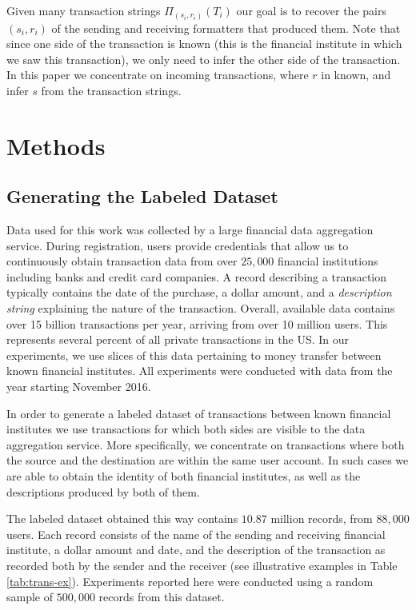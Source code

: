 \documentclass[sigconf]{acmart}
\begin{document}
Given many transaction strings $\Pi_{(s_i,r_i)} (T_i)$ our goal is to recover the pairs $(s_i,r_i)$ of the sending and receiving formatters that produced them. Note that since one side of the transaction is known (this is the financial institute in which we saw this transaction), we only need to infer the other side of the transaction. In this paper we concentrate on incoming transactions, where $r$ in known, and infer $s$ from the transaction strings. 

\section{Methods}
\label{sec:methods}

\subsection{Generating the Labeled Dataset}
\label{subs:dataset}

Data used for this work was collected by a large financial data aggregation service. During registration, users provide credentials that allow us to continuously obtain transaction data from over $25,000$ financial institutions including banks and credit card companies. A record describing a transaction typically contains the date of the purchase, a dollar amount, and a \textit{description string} explaining the nature of the transaction. Overall, available data contains over 15 billion transactions per year, arriving from over 10 million users. This represents several percent of all private transactions in the US. In our experiments, we use slices of this data pertaining to money transfer between known financial institutes. All experiments were conducted with data from the year starting November 2016.

In order to generate a labeled dataset of transactions between known financial institutes we use transactions for which both sides are visible to the data aggregation service. More specifically, we concentrate on transactions where both the source and the destination are within the same user account. In such cases we are able to obtain the identity of both financial institutes, as well as the descriptions produced by both of them. 

The labeled dataset obtained this way contains $10.87$ million records, from $88,000$ users. Each record consists of the name of the sending and receiving financial institute, a dollar amount and date, and the description of the transaction as recorded both by the sender and the receiver (see illustrative examples in Table \ref{tab:trans-ex}). Experiments reported here were conducted using a random sample of $500,000$ records from this dataset. 
\end{document}
